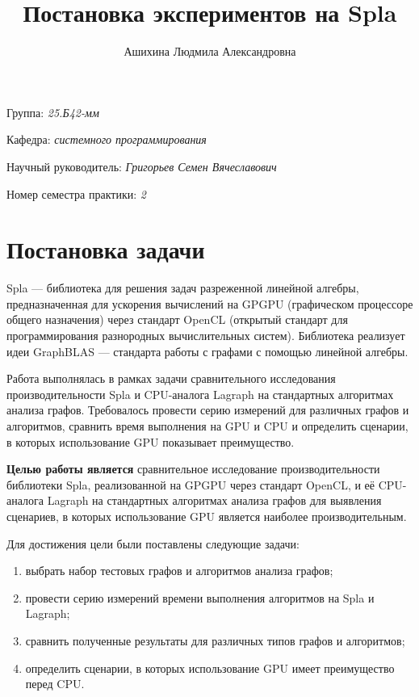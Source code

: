 \documentclass[a4paper]{article}
\title{Постановка экспериментов на Spla}
\author{Ашихина Людмила Александровна}
\date{}
\begin{document}
	
	\maketitle
	
	\begin{flushright}
		Группа: \emph{25.Б42-мм} 
		
		Кафедра: \emph{системного программирования}
		
		Научный руководитель: \emph{Григорьев Семен Вячеславович}
		
		
		Номер семестра практики: \emph{2}
	\end{flushright} 
	
	\section{Постановка задачи}
	
	Spla --- библиотека для решения задач разреженной линейной алгебры, предназначенная для ускорения вычислений на GPGPU (графическом процессоре общего назначения) через стандарт OpenCL (открытый стандарт для программирования разнородных вычислительных систем). Библиотека реализует идеи GraphBLAS --- стандарта работы с графами с помощью линейной алгебры.
	
	Работа выполнялась в рамках задачи сравнительного исследования производительности Spla и CPU-аналога Lagraph на стандартных алгоритмах анализа графов. Требовалось провести серию измерений для различных графов и алгоритмов, сравнить время выполнения на GPU и CPU и определить сценарии, в которых использование GPU показывает преимущество.
	
	\textbf{Целью работы является} сравнительное исследование производительности библиотеки Spla, реализованной на GPGPU через стандарт OpenCL, и её CPU-аналога Lagraph на стандартных алгоритмах анализа графов для выявления сценариев, в которых использование GPU является наиболее производительным.
	
	Для достижения цели были поставлены следующие задачи:
	\begin{enumerate}
		\item выбрать набор тестовых графов и алгоритмов анализа графов;
		\item провести серию измерений времени выполнения алгоритмов на Spla и Lagraph;
		\item сравнить полученные результаты для различных типов графов и алгоритмов;
		\item определить сценарии, в которых использование GPU имеет преимущество перед CPU.
	\end{enumerate}
	
\end{document}
